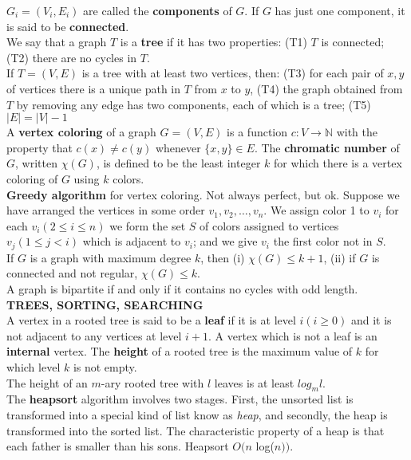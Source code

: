 \documentclass[10pt,landscape]{article}
\begin{document}
\begin{multicols}{4}
$G_{i} = (V_{i}, E_{i})$ are called the \textbf{components} of $G$. If
$G$ has just one component, it is said to be \textbf{connected}.\\
We say that a graph $T$ is a \textbf{tree} if it has two properties:
(T1) $T$ is connected; (T2) there are no cycles in $T$.\\
If $T = (V,E)$ is a tree with at least two vertices, then: (T3) for
each pair of $x,y$ of vertices there is a unique path in $T$ from $x$
to $y$, (T4) the graph obtained from $T$ by removing any edge has two
components, each of which is a tree; (T5) $|E| = |V|-1$\\
A \textbf{vertex coloring} of a graph $G = (V,E)$ is a function $c: V
\to \mathbb{N}$ with the property that $c(x) \neq c(y)$ whenever
$\{x,y\} \in E$. The \textbf{chromatic number} of $G$, written
$\chi(G)$, is defined to be the least integer $k$ for which there is a
vertex coloring of $G$ using $k$ colors.\\
\textbf{Greedy algorithm} for vertex coloring. Not always perfect, but
ok. Suppose we have arranged the vertices in some order $v_{1}, v_{2},
\dots ,v_{n}$. We assign color 1 to $v_{i}$ for each $v_{i}(2 \leq i
\leq n)$ we form the set $S$ of colors assigned to vertices $v_{j}(1
\leq j < i)$ which is adjacent to $v_{i}$; and we give $v_{i}$ the
first color not in $S$.\\
If $G$ is a graph with maximum degree $k$, then (i) $\chi(G) \leq k +
1$, (ii) if $G$ is connected and not regular, $\chi(G) \leq k$.\\
A graph is bipartite if and only if it contains no cycles with odd length.\\
\textbf{TREES, SORTING, SEARCHING}\\
A vertex in a rooted tree is said to be a \textbf{leaf} if it is at
level $i (i \geq 0)$ and it is not adjacent to any vertices at level
$i + 1$. A vertex which is not a leaf is an \textbf{internal}
vertex. The \textbf{height} of a rooted tree is the maximum value of
$k$ for which level $k$ is not empty.\\
The height of an $m$-ary rooted tree with $l$ leaves is at least
$log_{m}l$.\\
The \textbf{heapsort} algorithm involves two stages. First, the
unsorted list is transformed into a special kind of list know as
\textit{heap}, and secondly, the heap is transformed into the sorted
list. The characteristic property of a heap is that each father is
smaller than his sons. Heapsort $O(n$ log($n))$.\\

\end{multicols}
\end{document}
